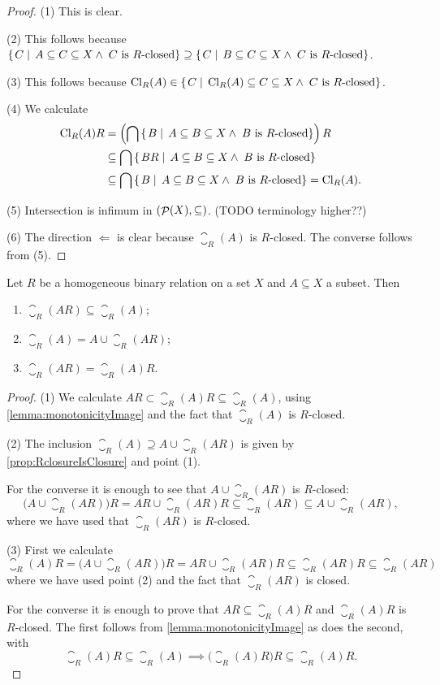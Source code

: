 \begin{proof}
(1) This is clear.

(2) This follows because $\left\{\left. C \;\right|\; A \subseteq C \subseteq X \land \;\text{$C$ is $R$-closed} \right\} \supseteq \left\{\left. C \;\right|\; B \subseteq C \subseteq X \land \;\text{$C$ is $R$-closed} \right\}$.

(3) This follows because $\operatorname{Cl}_R(A) \in \left\{\left. C \;\right|\; \operatorname{Cl}_R(A) \subseteq C \subseteq X \land \;\text{$C$ is $R$-closed} \right\}$.

(4) We calculate
\begin{align*}
\operatorname{Cl}_R(A)R &= \left(\bigcap \left\{\left. B \;\right|\; A \subseteq B \subseteq X \land \;\text{$B$ is $R$-closed} \right\}\right)R \\
&\subseteq \bigcap \left\{\left. BR \;\right|\; A \subseteq B \subseteq X \land \;\text{$B$ is $R$-closed} \right\} \\
&\subseteq \bigcap \left\{\left. B \;\right|\; A \subseteq B \subseteq X \land \;\text{$B$ is $R$-closed} \right\} = \operatorname{Cl}_R(A).
\end{align*}

(5) Intersection is infimum in $\left( \mathop{\mathcal{P}}(X),\subseteq \right)$. (TODO terminology higher??)

(6) The direction $\Leftarrow$ is clear because $\closure_R(A)$ is $R$-closed. The converse follows from (5).
\end{proof}

\begin{lemma}
Let $R$ be a homogeneous binary relation on a set $X$ and $A\subseteq X$ a subset. Then
\begin{enumerate}
\item $\closure_R(AR) \subseteq \closure_R(A)$;
\item $\closure_R(A) = A \cup \closure_R(AR)$;
\item $\closure_R(AR) = \closure_R(A)R$.
\end{enumerate}
\end{lemma}
\begin{proof}
(1) We calculate $AR \subset \closure_R(A)R \subseteq \closure_R(A)$, using \ref{lemma:monotonicityImage} and the fact that $\closure_R(A)$ is $R$-closed.

(2) The inclusion $\closure_R(A) \supseteq A \cup \closure_R(AR)$ is given by \ref{prop:RclosureIsClosure} and point (1).

For the converse it is enough to see that $A \cup \closure_R(AR)$ is $R$-closed:
\[ \big(A \cup \closure_R(AR)\big)R = AR \cup \closure_R(AR)R \subseteq \closure_R(AR) \subseteq A \cup \closure_R(AR), \]
where we have used that $\closure_R(AR)$ is $R$-closed.

(3) First we calculate
\[ \closure_R(A)R = \big(A \cup \closure_R(AR)\big)R = AR \cup \closure_R(AR)R \subseteq \closure_R(AR)R \subseteq \closure_R(AR) \]
where we have used point (2) and the fact that $\closure_R(AR)$ is closed.

For the converse it is enough to prove that $AR \subseteq \closure_R(A)R$ and $\closure_R(A)R$ is $R$-closed. The first follows from \ref{lemma:monotonicityImage} as does the second, with
\[ \closure_R(A)R \subseteq \closure_R(A) \implies \big(\closure_R(A)R\big)R \subseteq \closure_R(A)R. \]
\end{proof}

